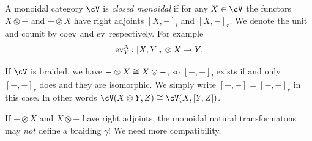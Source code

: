 \documentclass[a4paper,11pt,oneside,openany]{scrbook}
\begin{document}
\begin{defn}
	A monoidal category $ \cV $ is \emph{closed monoidal} if for any $ X \in \cV
    $ the functors $ X\otimes - $ and $ -\otimes X $ have right adjoints $
    [X,-]_l $ and $ [X,-]_r $.
	We denote the unit and counit by $ \operatorname{coev} $ and $ \operatorname{ev} $ respectively.
	For example
	\begin{displaymath}
		\operatorname{ev}^X_Y \colon [X,Y]_r \otimes X \rightarrow Y.
	\end{displaymath}
\end{defn}
\begin{rmk}
	If $ \cV $ is braided, we have $ -\otimes X \cong X\otimes - $, so $ [-,-]_l
    $ exists if and only $ [-,-]_r $ does and they are isomorphic.
	We simply write $ [-,-] = [-,-]_r $ in this case.
	In other words $ \cV(X\otimes Y,Z)\iso \cV(X,[Y,Z]) $.
\end{rmk}

\begin{rmk}
	If $ -\otimes X $ and $ X\otimes - $ have right adjoints, the monoidal
    natural transformatons may \emph{not} define a braiding $ \gamma $!
	We need more compatibility.
\end{rmk}
\end{document}
